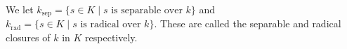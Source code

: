 We let $k_{\text{sep}} = \{s \in K \mid s \text{ is separable over } k\}$ and $k_{\text{rad}} = \{s \in K \mid s \text{ is radical over } k\}$. These are called the separable and radical closures of $k$ in $K$ respectively.
